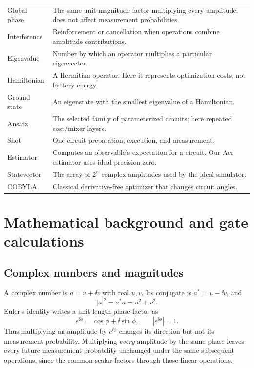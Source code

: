 \begin{longtable}{@{}p{}>{\raggedright\arraybackslash}p{}@{}}
Global phase & The same unit-magnitude factor multiplying every amplitude; does not affect measurement probabilities.\\
Interference & Reinforcement or cancellation when operations combine amplitude contributions.\\
Eigenvalue & Number by which an operator multiplies a particular eigenvector.\\
Hamiltonian & A Hermitian operator. Here it represents optimization costs, not battery energy.\\
Ground state & An eigenstate with the smallest eigenvalue of a Hamiltonian.\\
Ansatz & The selected family of parameterized circuits; here repeated cost/mixer layers.\\
Shot & One circuit preparation, execution, and measurement.\\
Estimator & Computes an observable's expectation for a circuit. Our Aer estimator uses ideal precision zero.\\
Statevector & The array of $2^n$ complex amplitudes used by the ideal simulator.\\
COBYLA & Classical derivative-free optimizer that changes circuit angles.\\
\end{longtable}
\renewcommand{\arraystretch}{1}

\clearpage
\section{Mathematical background and gate calculations}\label{app:math}
\subsection{Complex numbers and magnitudes}
A complex number is $a=u+\ii v$ with real $u,v$. Its conjugate is
$a^*=u-\ii v$, and
\begin{equation}
|a|^2=a^*a=u^2+v^2.
\end{equation}
Euler's identity writes a unit-length phase factor as
\begin{equation}
e^{\ii\phi}=\cos\phi+\ii\sin\phi,\qquad |e^{\ii\phi}|=1.
\end{equation}
Thus multiplying an amplitude by $e^{\ii\phi}$ changes its direction but not its
measurement probability. Multiplying \emph{every} amplitude by the same phase
leaves every future measurement probability unchanged under the same subsequent
operations, since the common scalar factors through those linear operations.


